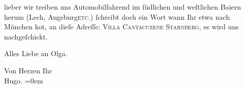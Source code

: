 \pstart{}lieber\pend\vspace{0.5em}
\pstart
           wir treiben uns Automobilfahrend im{ }ſüdlichen und weſtlichen Baiern herum (Lech, Augsburg\textsc{etc}.){ }ſchreibt doch ein Wort wann Ihr etwa nach München ko{\geminationm}t, an
                  {\pb}dieſe Adreſſe: \textsc{Villa Cantacuzene Starnberg}, es wird uns nachgeſchickt.\pend
           
\pstart
           Alles Liebe an Olga.\pend
           
\pstart
           Von Herzen Ihr{\\[\baselineskip]}\spacefill\mbox{Hugo.}\pend
           \leftskip=0em{}\endnumbering{}  \newcommand{\dateiname}{L01844}\newcommand{\titel}{Hugo von Hofmannsthal an Arthur Schnitzler, [11. 6. 1909]}\newcommand{\editorInnen}{Martin Anton Müller und Gerd-Hermann Susen}
